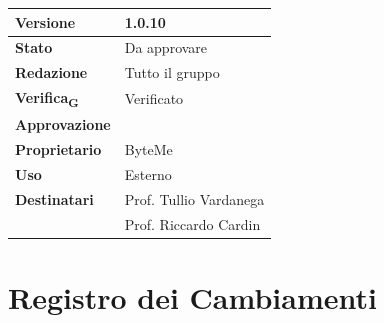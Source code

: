 \documentclass[11pt,a4paper]{article}
\newcommand{\gls}[1]{#1\textsubscript{G}}
\begin{document}
\begin{titlepage}
    \begin{table}[H]
        \centering
        \begin{tabular}{|l|p{5cm}|}
            \hline
            \textbf{Versione} & 1.0.10 \\
            \hline
            \textbf{Stato} & Da approvare\\
            \hline
            \textbf{Redazione} & Tutto il gruppo \\
            \hline
            \textbf{\gls{Verifica}} & Verificato \\
            \hline
            \textbf{Approvazione} & \\
            \hline
            \textbf{Proprietario} & ByteMe \\
            \hline
            \textbf{Uso} & Esterno \\
            \hline
            \textbf{Destinatari} & Prof. Tullio Vardanega \\ & Prof. Riccardo Cardin \\
            \hline
        \end{tabular}
    \end{table}
    
    \vfill
\end{titlepage}

\thispagestyle{empty}
\section*{Registro dei Cambiamenti}
\end{document}
